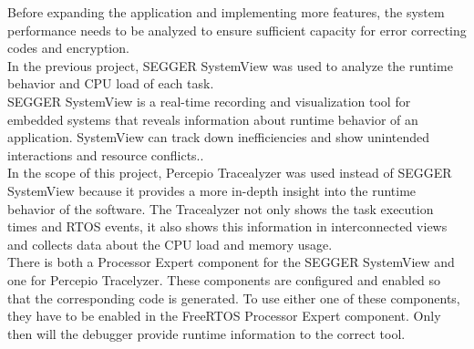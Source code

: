 %
Before expanding the application and implementing more features, the system performance needs to be analyzed to ensure sufficient capacity for error correcting codes and encryption.\\
In the previous project, SEGGER SystemView was used to analyze the runtime behavior and CPU load of each task.\\
SEGGER SystemView is a real-time recording and visualization tool for embedded systems that reveals information about runtime behavior of an application. SystemView can  track down inefficiencies and show unintended interactions and resource conflicts.\cite{SeggerSystemView}.\\
In the scope of this project, Percepio Tracealyzer was used instead of SEGGER SystemView because it provides a more in-depth insight into the runtime behavior of the software. The Tracealyzer not only shows the task execution times and RTOS events, it also shows this information in interconnected views and collects data about the CPU load and memory usage.\\
There is both a Processor Expert component for the SEGGER SystemView and one for Percepio Tracelyzer. These components are configured and enabled so that the corresponding code is generated. To use either one of these components, they have to be enabled in the FreeRTOS Processor Expert component. Only then will the debugger provide runtime information to the correct tool.\\
%
%
